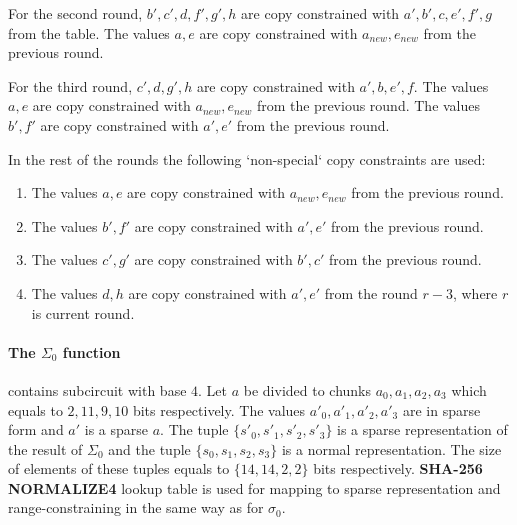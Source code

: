 For the second round, $b', c' , d, f', g', h$ are copy constrained with $a', b', c, e', f', g$ from the table.
The values $a, e$ are copy constrained with $a_{new}, e_{new}$ from the previous round.

For the third round, $c' , d, g', h$ are copy constrained with $a', b, e', f$.
The values $a, e$ are copy constrained with $a_{new}, e_{new}$ from the previous round.
The values $b', f'$ are copy constrained with $a', e'$ from the previous round.

In the rest of the rounds the following `non-special` copy constraints are used:
\begin{enumerate}
\item The values $a, e$ are copy constrained with $a_{new}, e_{new}$ from the previous round.
\item The values $b', f'$ are copy constrained with $a', e'$ from the previous round.
\item The values $c', g'$ are copy constrained with $b', c'$ from the previous round.
\item The values $d, h$ are copy constrained with $a', e'$ from the round $r - 3$, where $r$ is current round.
\end{enumerate}

\paragraph{The $\Sigma_0$ function}
contains subcircuit with base $4$.
Let $a$ be divided to chunks $a_0, a_1, a_2, a_3$ which equals to $2, 11, 9, 10$ bits respectively.
The values $a'_0, a'_1, a'_2, a'_3$ are in sparse form and $a'$ is a sparse $a$.
The tuple $\{ s'_0, s'_1, s'_2, s'_3\}$ is a sparse representation of the result of $\Sigma_0$ and the tuple $\{ s_0, s_1, s_2, s_3\}$  is a normal representation.
The size of elements of these tuples equals to $\{14, 14, 2, 2\}$ bits respectively.
\textbf{SHA-256 NORMALIZE4} lookup table is used for mapping to sparse representation and range-constraining in the same way as for $\sigma_0$.

